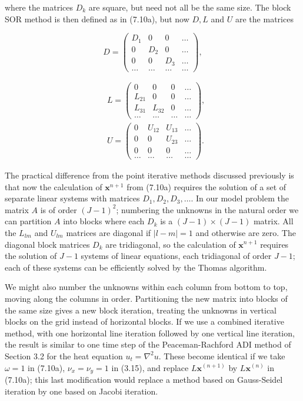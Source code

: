 \documentclass[10pt]{article}
\begin{document}
where the matrices \(D_{k}\) are square, but need not all be the same size. The block SOR method is then defined as in (7.10a), but now \(D, L\) and \(U\) are the matrices

\[
D=\left(\begin{array}{rrrr}
D_{1} & 0 & 0 & \ldots \\
0 & D_{2} & 0 & \ldots \\
0 & 0 & D_{3} & \ldots \\
\ldots & \ldots & \ldots & \ldots
\end{array}\right),
\]

\[
\begin{aligned}
& L=\left(\begin{array}{rrrr}
0 & 0 & 0 & \ldots \\
L_{21} & 0 & 0 & \ldots \\
L_{31} & L_{32} & 0 & \ldots \\
\ldots & \ldots & \ldots & \ldots
\end{array}\right), \\
& U=\left(\begin{array}{rrrr}
0 & U_{12} & U_{13} & \ldots \\
0 & 0 & U_{23} & \ldots \\
0 & 0 & 0 & \ldots \\
\ldots & \ldots & \ldots & \ldots
\end{array}\right) .
\end{aligned}
\]

The practical difference from the point iterative methods discussed previously is that now the calculation of \(\mathbf{x}^{n+1}\) from (7.10a) requires the solution of a set of separate linear systems with matrices \(D_{1}, D_{2}, D_{3}, \ldots\). In our model problem the matrix \(A\) is of order \((J-1)^{2}\); numbering the unknowns in the natural order we can partition \(A\) into blocks where each \(D_{k}\) is a \((J-1) \times(J-1)\) matrix. All the \(L_{l m}\) and \(U_{l m}\) matrices are diagonal if \(|l-m|=1\) and otherwise are zero. The diagonal block matrices \(D_{k}\) are tridiagonal, so the calculation of \(\mathbf{x}^{n+1}\) requires the solution of \(J-1\) systems of linear equations, each tridiagonal of order \(J-1\); each of these systems can be efficiently solved by the Thomas algorithm.

We might also number the unknowns within each column from bottom to top, moving along the columns in order. Partitioning the new matrix into blocks of the same size gives a new block iteration, treating the unknowns in vertical blocks on the grid instead of horizontal blocks. If we use a combined iterative method, with one horizontal line iteration followed by one vertical line iteration, the result is similar to one time step of the Peaceman-Rachford ADI method of Section 3.2 for the heat equation \(u_{t}=\nabla^{2} u\). These become identical if we take \(\omega=1\) in (7.10a), \(\nu_{x}=\nu_{y}=1\) in (3.15), and replace \(L \mathbf{x}^{(n+1)}\) by \(L \mathbf{x}^{(n)}\) in (7.10a); this last modification would replace a method based on Gauss-Seidel iteration by one based on Jacobi iteration.
\end{document}
